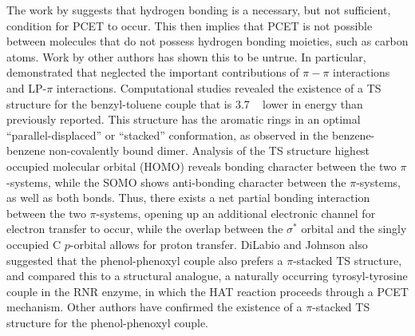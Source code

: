 \begin{doublespace}
The work by \citet{Mayer2002} suggests that hydrogen bonding is a necessary, but
not sufficient, condition for PCET to occur. This then implies that PCET is not
possible between molecules that do not possess hydrogen bonding moieties, such
as carbon atoms. Work by other authors has shown this to be
untrue.\cite{Hatcher2007, DiLabio2007} In particular, \citet{DiLabio2007}
demonstrated that \citet{Mayer2002} neglected the important contributions of
$\pi-\pi$ interactions and LP-$\pi$ interactions. Computational studies revealed
the existence of a TS structure for the benzyl-toluene couple that is 3.7
\kcalmol~ lower in energy than previously reported. This structure has the
aromatic rings in an optimal ``parallel-displaced'' or ``stacked'' conformation,
as observed in the benzene-benzene non-covalently bound
dimer.\cite{Sinnokrot2002} Analysis of the TS structure highest occupied
molecular orbital (HOMO) reveals bonding character between the two
$\pi$-systems, while the SOMO shows anti-bonding character between the
$\pi$-systems, as well as both  bonds. Thus, there exists a net partial
bonding interaction between the two $\pi$-systems, opening up an additional
electronic channel for electron transfer to occur, while the overlap between the
 $\sigma^*$ orbital and the singly occupied C $p$-orbital allows for
proton transfer. DiLabio and Johnson also suggested that the phenol-phenoxyl
couple also prefers a $\pi$-stacked TS structure, and compared this to a
structural analogue, a naturally occurring tyrosyl-tyrosine couple in the RNR
enzyme, in which the HAT reaction proceeds through a PCET mechanism. Other
authors have confirmed the existence of a $\pi$-stacked TS structure for the
phenol-phenoxyl couple.\cite{Sirjoosingh2011, HammesSchiffer2015,
MunozRugeles2017}


\end{doublespace}
